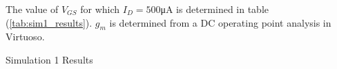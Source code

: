 
The value of $V_{GS}$ for which $I_{D} = 500$\si{\micro\ampere} is determined in table (\ref{tab:sim1_results}).
$g_{m}$ is determined from a DC operating point analysis in Virtuoso.

\FloatBarrier

\begin{table}[h!]
	\centering
	\caption{Simulation 1 Results}
	\label{tab:sim1_results}
\end{table}

\FloatBarrier
